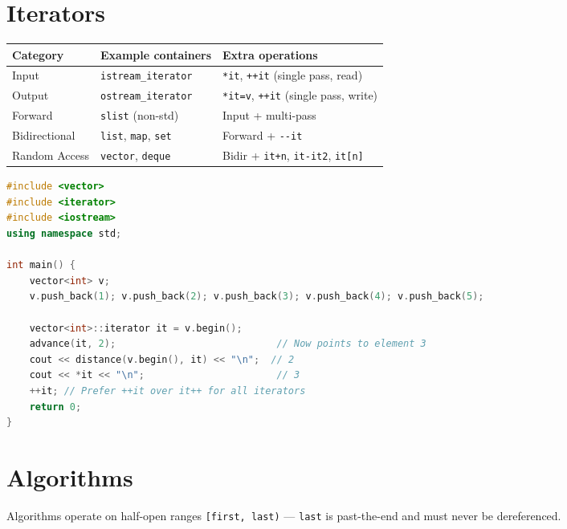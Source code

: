 \section{Iterators}
\label{sec:iterators}

\begin{center}
\begin{tabular}{|l|l|l|}
\hline
\textbf{Category} & \textbf{Example containers} & \textbf{Extra operations} \\
\hline
Input            & \texttt{istream\_iterator} & \texttt{*it}, \texttt{++it} (single pass, read) \\
Output           & \texttt{ostream\_iterator} & \texttt{*it=v}, \texttt{++it} (single pass, write) \\
Forward          & \texttt{slist} (non-std)   & Input + multi-pass \\
Bidirectional    & \texttt{list}, \texttt{map}, \texttt{set} & Forward + \texttt{-{}-it} \\
Random Access    & \texttt{vector}, \texttt{deque} & Bidir + \texttt{it+n}, \texttt{it-it2}, \texttt{it[n]} \\
\hline
\end{tabular}
\end{center}

\begin{lstlisting}[language=C++, caption={advance and distance}]
#include <vector>
#include <iterator>
#include <iostream>
using namespace std;

int main() {
    vector<int> v;
    v.push_back(1); v.push_back(2); v.push_back(3); v.push_back(4); v.push_back(5);

    vector<int>::iterator it = v.begin();
    advance(it, 2);                            // Now points to element 3
    cout << distance(v.begin(), it) << "\n";  // 2
    cout << *it << "\n";                       // 3
    ++it; // Prefer ++it over it++ for all iterators
    return 0;
}
\end{lstlisting}

\section{Algorithms}
\label{sec:algorithms}

Algorithms operate on half-open ranges \texttt{[first, last)} --- \texttt{last} is past-the-end and must never be dereferenced.

